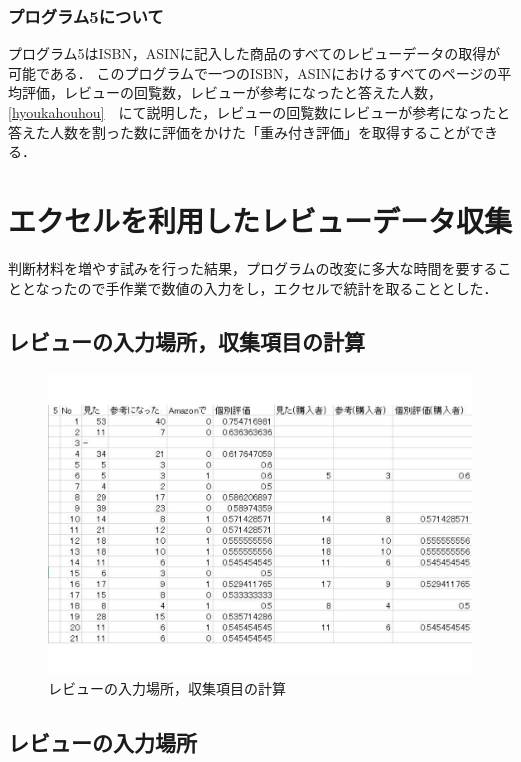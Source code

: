 \subsubsection{プログラム5について}

プログラム5はISBN，ASINに記入した商品のすべてのレビューデータの取得が可能である．
このプログラムで一つのISBN，ASINにおけるすべてのページの平均評価，レビューの回覧数，レビューが参考になったと答えた人数，\ref{hyoukahouhou}　にて説明した，レビューの回覧数にレビューが参考になったと答えた人数を割った数に評価をかけた「重み付き評価」を取得することができる．



\section{エクセルを利用したレビューデータ収集}
判断材料を増やす試みを行った結果，プログラムの改変に多大な時間を要することとなったので手作業で数値の入力をし，エクセルで統計を取ることとした．



\subsection{レビューの入力場所，収集項目の計算}

\begin{figure}[htbp]

\centering
\includegraphics[width=12cm,clip]{ekuseru.pdf}
\caption{レビューの入力場所，収集項目の計算}
\label{ekuseru}

\end{figure}

\subsection{レビューの入力場所}

